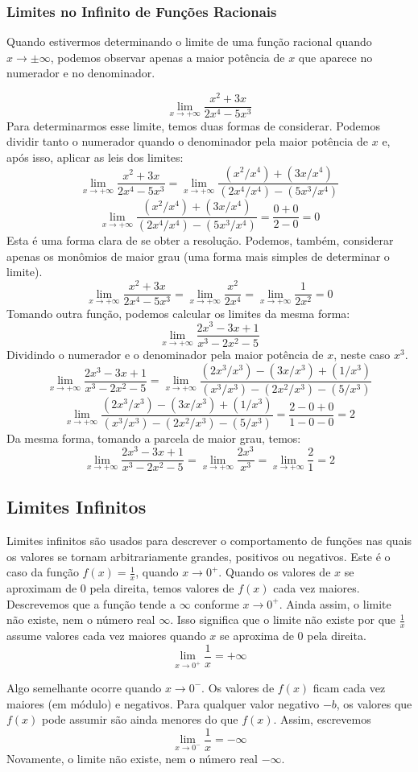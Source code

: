 \subsubsection{Limites no Infinito de Funções Racionais}
Quando estivermos determinando o limite de uma função racional quando \\ $x \rightarrow \pm \infty$, podemos observar apenas a maior potência de $x$ que aparece no numerador e no denominador.
\begin{exemplo}
\[\lim_{x \rightarrow +\infty}\dfrac{x^2+3x}{2x^4-5x^3}\]
Para determinarmos esse limite, temos duas formas de considerar. Podemos dividir tanto o numerador quando o denominador pela maior potência de $x$ e, após isso, aplicar as leis dos limites:
\[\lim_{x \rightarrow +\infty}\dfrac{x^2+3x}{2x^4-5x^3}=\lim_{x \rightarrow +\infty}\dfrac{(x^2/x^4)+(3x/x^4)}{(2x^4/x^4)-(5x^3/x^4)}\]
\[\lim_{x \rightarrow +\infty}\dfrac{(x^2/x^4)+(3x/x^4)}{(2x^4/x^4)-(5x^3/x^4)}=\dfrac{0+0}{2-0}=0\]
Esta é uma forma clara de se obter a resolução. Podemos, também, considerar apenas os monômios de maior grau (uma forma mais simples de determinar o limite).
\[\lim_{x \rightarrow +\infty}\dfrac{x^2+3x}{2x^4-5x^3}=\lim_{x \rightarrow +\infty}\dfrac{x^2}{2x^4}=\lim_{x \rightarrow +\infty}\dfrac{1}{2x^2}=0\]
Tomando outra função, podemos calcular os limites da mesma forma:
\[\lim_{x\rightarrow + \infty}\dfrac{2x^3-3x+1}{x^3-2x^2-5}\]
Dividindo o numerador e o denominador pela maior potência de $x$, neste caso $x^3$.
\[\lim_{x\rightarrow + \infty}\dfrac{2x^3-3x+1}{x^3-2x^2-5}=\lim_{x\rightarrow + \infty}\dfrac{(2x^3/x^3)-(3x/x^3)+(1/x^3)}{(x^3/x^3)-(2x^2/x^3)-(5/x^3)}\]
\[\lim_{x\rightarrow + \infty}\dfrac{(2x^3/x^3)-(3x/x^3)+(1/x^3)}{(x^3/x^3)-(2x^2/x^3)-(5/x^3)}=\dfrac{2-0+0}{1-0-0}=2\]
Da mesma forma, tomando a parcela de maior grau, temos:
\[\lim_{x\rightarrow + \infty}\dfrac{2x^3-3x+1}{x^3-2x^2-5}=\lim_{x\rightarrow + \infty}\dfrac{2x^3}{x^3}=\lim_{x\rightarrow + \infty}\dfrac{2}{1}=2\]
\end{exemplo}
\subsection{Limites Infinitos}
Limites infinitos são usados para descrever o comportamento de funções nas quais os valores se tornam arbitrariamente grandes, positivos ou negativos. Este é o caso da função $f(x)=\frac{1}{x}$, quando $x \rightarrow 0^+$. Quando os valores de $x$ se aproximam de $0$ pela direita, temos valores de $f(x)$ cada vez maiores. Descrevemos que a função tende a $\infty$ conforme $x \rightarrow 0^+$. Ainda assim, o limite não existe, nem o número real $\infty$. Isso significa que o limite não existe por que $\frac{1}{x}$ assume valores cada vez maiores quando $x$ se aproxima de $0$ pela direita.
\[\lim_{x \rightarrow 0^+}\dfrac{1}{x}=+\infty\] \par 
Algo semelhante ocorre quando $x \rightarrow 0^-$. Os valores de $f(x)$ ficam cada vez maiores (em módulo) e negativos. Para qualquer valor negativo $-b$, os valores que $f(x)$ pode assumir são ainda menores do que $f(x)$. Assim, escrevemos
\[\lim_{x \rightarrow 0^-}\dfrac{1}{x}=-\infty\]
Novamente, o limite não existe, nem o número real $-\infty$.
